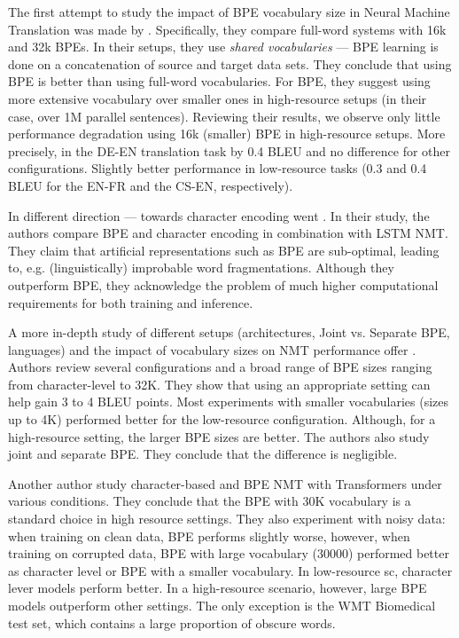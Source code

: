 The first attempt to study the impact of BPE vocabulary size in Neural Machine Translation was made by . Specifically, they compare full-word systems with 16k and 32k BPEs. In their setups, they use \textit{shared vocabularies} --- BPE learning is done on a concatenation of source and target data sets. They conclude that using BPE is better than using full-word vocabularies. For BPE, they suggest using more extensive vocabulary over smaller ones in high-resource setups (in their case, over 1M parallel sentences). Reviewing their results, we observe only little performance degradation using 16k (smaller) BPE in high-resource setups. More precisely, in the DE-EN translation task by 0.4 BLEU and no difference for other configurations. Slightly better performance in low-resource tasks (0.3 and 0.4 BLEU for the EN-FR and the CS-EN, respectively).

In different direction --- towards character encoding went . In their study, the authors compare BPE and character encoding in combination with LSTM NMT. They claim that artificial representations such as BPE are sub-optimal, leading to, e.g. (linguistically) improbable word fragmentations. Although they outperform BPE, they acknowledge the problem of much higher computational requirements for both training and inference.

A more in-depth study of different setups (architectures, Joint vs. Separate BPE, languages) and the impact of vocabulary sizes on NMT performance offer . Authors review several configurations and a broad range of BPE sizes ranging from character-level to 32K. They show that using an appropriate setting can help gain 3 to 4 BLEU points. Most experiments with smaller vocabularies (sizes up to 4K) performed better for the low-resource configuration. Although, for a high-resource setting, the larger BPE sizes are better. The authors also study joint and separate BPE. They conclude that the difference is negligible.


Another author  study character-based and BPE NMT with Transformers under various conditions. They conclude that the BPE with 30K vocabulary is a standard choice in high resource settings. They also experiment with noisy data: when training on clean data, BPE performs slightly worse, however, when training on corrupted data, BPE with large vocabulary (30000) performed better as character level or BPE with a smaller vocabulary. In low-resource sc, character lever models perform better. In a high-resource scenario, however, large BPE models outperform other settings. The only exception is the WMT Biomedical test set, which contains a large proportion of obscure words.


